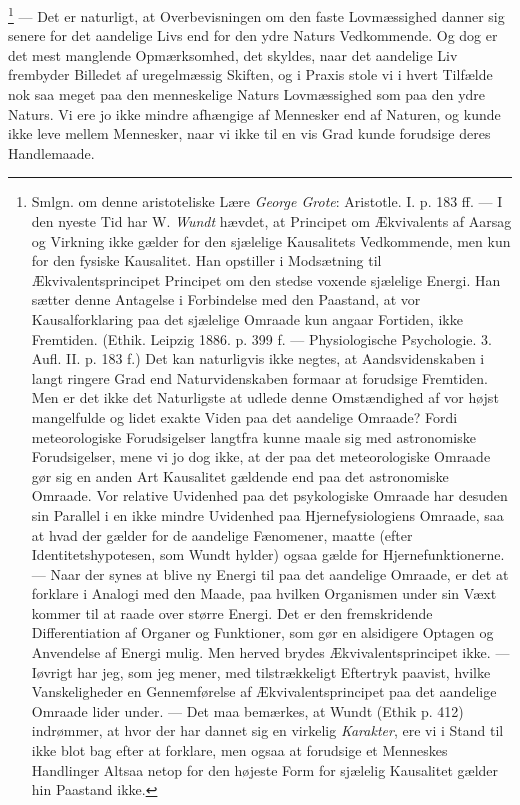 \documentclass[12pt,a4paper,openany]{book}
\newcommand{\opage}[1]{\marginnote{\footnotesize\textit{[#1]}}}
\begin{document}
\footnote[2]{Smlgn. om denne aristoteliske Lære \emph{George Grote}: Aristotle.
I. p. 183 ff. --- I den nyeste Tid har W. \emph{Wundt} hævdet, at Principet om
Ækvivalents af Aarsag og Virkning ikke gælder for den sjælelige Kausalitets
Vedkommende, men kun for den fysiske Kausalitet. Han opstiller i Modsætning til
Ækvivalentsprincipet Principet om den stedse voxende sjælelige Energi. Han
sætter denne Antagelse i Forbindelse med den Paastand, at vor Kausalforklaring
paa det sjælelige Omraade kun angaar Fortiden, ikke Fremtiden. (Ethik. Leipzig
1886. p. 399 f. --- Physiologische Psychologie. 3. Aufl. II. p. 183 f.) Det kan
naturligvis ikke negtes, at Aandsvidenskaben i langt ringere Grad end
Naturvidenskaben formaar at forudsige Fremtiden. Men er det ikke det
Naturligste at udlede denne Omstændighed af vor højst mangelfulde og lidet
exakte Viden paa det aandelige Omraade? Fordi meteorologiske Forudsigelser
langtfra kunne maale sig med astronomiske Forudsigelser, mene vi jo dog ikke,
at der paa det meteorologiske Omraade gør sig en anden Art Kausalitet gældende
end paa det astronomiske Omraade. Vor relative Uvidenhed paa det psykologiske
Omraade har desuden sin Parallel i en ikke mindre Uvidenhed paa
Hjernefysiologiens Omraade, saa at hvad der gælder for de aandelige Fænomener,
maatte (efter Identitetshypotesen, som Wundt hylder) ogsaa gælde for
Hjernefunktionerne. --- Naar der synes at blive ny Energi til paa det aandelige
Omraade, er det at forklare i Analogi med den Maade, paa hvilken Organismen
under sin Væxt kommer til at raade over større Energi. Det er den fremskridende
Differentiation af Organer og Funktioner, som gør en alsidigere Optagen og
Anvendelse af Energi mulig. Men herved brydes Ækvivalentsprincipet ikke. ---
Iøvrigt har jeg, som jeg mener, med tilstrækkeligt Eftertryk paavist, hvilke
Vanskeligheder en Gennemførelse af Ækvivalentsprincipet paa det aandelige
Omraade lider under. --- Det maa bemærkes, at Wundt (Ethik p. 412) indrømmer,
at hvor der har dannet sig en virkelig \emph{Karakter}, ere vi i Stand til ikke
blot bag efter at forklare, men ogsaa at forudsige et Menneskes Handlinger
Altsaa netop for den højeste Form for sjælelig Kausalitet gælder hin Paastand
ikke.} --- Det er naturligt, at Overbevisningen om
\setcounter{footnote}{0}%
\opage{96}den faste Lovmæssighed danner sig senere for det aandelige Livs end
for den ydre Naturs Vedkommende. Og dog er det mest manglende Opmærksomhed, det
skyldes, naar det aandelige Liv frembyder Billedet af uregelmæssig Skiften, og
i Praxis stole vi i hvert Tilfælde nok saa meget paa den menneskelige Naturs
Lovmæssighed som paa den ydre Naturs. Vi ere jo ikke mindre afhængige af
Mennesker end af Naturen, og kunde ikke leve mellem Mennesker, naar vi ikke til
en vis Grad kunde forudsige deres Handlemaade.
\end{document}
